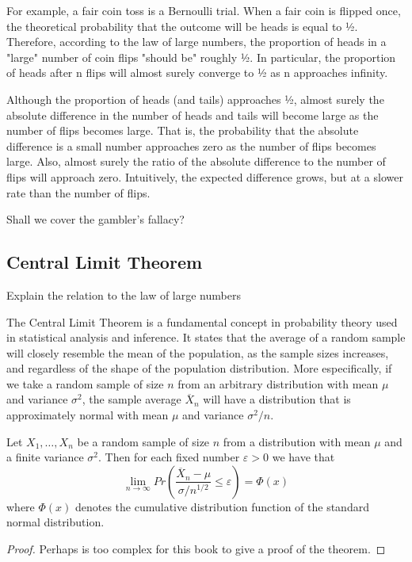 \begin{example}

{\color{red} For example, a fair coin toss is a Bernoulli trial. When a fair coin is flipped once, the theoretical probability that the outcome will be heads is equal to 1⁄2. Therefore, according to the law of large numbers, the proportion of heads in a "large" number of coin flips "should be" roughly 1⁄2. In particular, the proportion of heads after n flips will almost surely converge to 1⁄2 as n approaches infinity.}

{\color{red} Although the proportion of heads (and tails) approaches 1⁄2, almost surely the absolute difference in the number of heads and tails will become large as the number of flips becomes large. That is, the probability that the absolute difference is a small number approaches zero as the number of flips becomes large. Also, almost surely the ratio of the absolute difference to the number of flips will approach zero. Intuitively, the expected difference grows, but at a slower rate than the number of flips.}

\end{example}

{\color{red} Shall we cover the gambler's fallacy?}


\subsection{Central Limit Theorem}

{\color{red} Explain the relation to the law of large numbers}

The Central Limit Theorem is a fundamental concept in probability theory used in statistical analysis and inference. It states that the average of a random sample will closely resemble the mean of the population, as the sample sizes increases, and regardless of the shape of the population distribution. More especifically, if we take a random sample of size $n$ from an arbitrary distribution with mean $\mu$ and variance $\sigma^{2}$, the sample average $\overline{X}_{n}$ will have a distribution that is approximately normal with mean $\mu$ and variance $\sigma^{2}/n$.

\begin{theorem}
Let $X_{1}, \ldots, X_{n}$ be a random sample of size $n$ from a distribution with mean $\mu$ and a finite variance $\sigma^{2}$. Then  for each fixed number $\varepsilon > 0$ we have that
\[
\lim_{n \rightarrow \infty} Pr \left( \frac{\overline{X}_{n}-\mu}{\sigma/n^{1/2}} \leq \varepsilon \right) = \Phi \left( x \right)
\]
where $\Phi \left( x \right)$ denotes the cumulative distribution function of the standard normal distribution.
\end{theorem}
\begin{proof}
{\color{red} Perhaps is too complex for this book to give a proof of the theorem.}
\end{proof}

